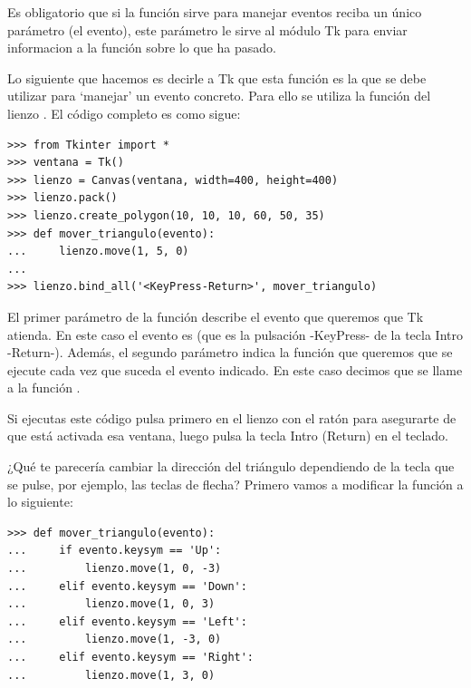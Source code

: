 Es obligatorio que si la función sirve para manejar eventos reciba un único parámetro (el evento), este parámetro le sirve al módulo Tk para enviar informacion a la función sobre lo que ha pasado.

Lo siguiente que hacemos es decirle a Tk que esta función es la que se debe utilizar para `manejar' un evento concreto. Para ello se utiliza la función del lienzo . El código completo es como sigue:

\begin{listing}
\begin{verbatim}
>>> from Tkinter import *
>>> ventana = Tk()
>>> lienzo = Canvas(ventana, width=400, height=400)
>>> lienzo.pack()
>>> lienzo.create_polygon(10, 10, 10, 60, 50, 35)
>>> def mover_triangulo(evento):
...     lienzo.move(1, 5, 0)
...
>>> lienzo.bind_all('<KeyPress-Return>', mover_triangulo)
\end{verbatim}
\end{listing}

El primer parámetro de la función  describe el evento que queremos que Tk atienda.  En este caso el evento es  (que es la pulsación -KeyPress- de la tecla Intro -Return-).  Además, el segundo parámetro indica la función que queremos que se ejecute cada vez que suceda el evento indicado. En este caso decimos que se llame a la función .

Si ejecutas este código pulsa primero en el lienzo con el ratón para asegurarte de que está activada esa ventana, luego pulsa la tecla Intro (Return) en el teclado.

¿Qué te parecería cambiar la dirección del triángulo dependiendo de la tecla que se pulse, por ejemplo, las teclas de flecha?  Primero vamos a modificar la función  a lo siguiente:

\begin{listing}
\begin{verbatim}
>>> def mover_triangulo(evento):
...     if evento.keysym == 'Up':
...         lienzo.move(1, 0, -3)
...     elif evento.keysym == 'Down':
...         lienzo.move(1, 0, 3)
...     elif evento.keysym == 'Left':
...         lienzo.move(1, -3, 0)
...     elif evento.keysym == 'Right':
...         lienzo.move(1, 3, 0)
\end{verbatim}
\end{listing}

